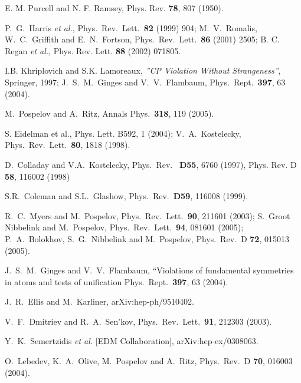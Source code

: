 \documentclass[prl,twocolumn,tightenlines,preprintnumbers,floatfix,nofootinbib]{revtex4}
\def \bi{\bibitem}
\begin{document}
\begin{thebibliography}{99}
\bi{PR} E. M. Purcell and N. F. Ramsey, Phys. Rev. {\bf 78}, 807 (1950).

P.~G.~Harris {\it et al.},
Phys.\ Rev.\ Lett.\  {\bf 82} (1999) 904; 
M.~V.~Romalis, W.~C.~Griffith and E.~N.~Fortson,
Phys.\ Rev.\ Lett.\  {\bf 86} (2001) 2505;
B. C. Regan {\em et al.},  Phys. Rev. Lett. {\bf 88} (2002) 
071805.

\bi{KL} I.B. Khriplovich and S.K. Lamoreaux, {\it ''CP Violation 
Without Strangeness''}, Springer, 1997;
J.~S.~M.~Ginges and V.~V.~Flambaum,
Phys.\ Rept.\  {\bf 397}, 63 (2004).

\bi{PRann}M.~Pospelov and A.~Ritz,
  Annals Phys.\  {\bf 318}, 119 (2005).

\bi{K_CPT} S. Eidelman et al., Phys. Lett. B592, 1 (2004); V.~A.~Kostelecky,
  Phys.\ Rev.\ Lett.\  {\bf 80}, 1818 (1998).


 D.~Colladay and V.A.~Kostelecky, Phys.\ Rev.\ {\bf
D55}, 6760 (1997), Phys. Rev. D {\bf 58}, 116002 (1998)%

S.R.~Coleman and S.L.~Glashow, Phys.\ Rev.\ {\bf D59}, 116008
(1999). %


 R.~C.~Myers and M.~Pospelov,
  Phys.\ Rev.\ Lett.\  {\bf 90}, 211601 (2003);
S.~Groot Nibbelink and M.~Pospelov,
  Phys.\ Rev.\ Lett.\  {\bf 94}, 081601 (2005);
P.~A.~Bolokhov, S.~G.~Nibbelink and M.~Pospelov,
  Phys.\ Rev.\ D {\bf 72}, 015013 (2005).

  J.~S.~M.~Ginges and V.~V.~Flambaum,
   ``Violations of fundamental symmetries in atoms and tests of unification
  Phys.\ Rept.\  {\bf 397}, 63 (2004).


 J.~R.~Ellis and M.~Karliner,
  arXiv:hep-ph/9510402.



\bi{DS}
V.~F.~Dmitriev and R.~A.~Sen'kov,
Phys.\ Rev.\ Lett.\  {\bf 91}, 212303 (2003).


\bi{Deut}
Y.~K.~Semertzidis {\it et al.}  [EDM Collaboration],
arXiv:hep-ex/0308063.

\bi{LOPR}O.~Lebedev, K.~A.~Olive, M.~Pospelov and A.~Ritz,
  Phys.\ Rev.\ D {\bf 70}, 016003 (2004).

\end{thebibliography}
\end{document}
